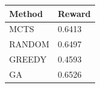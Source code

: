 \begin{tabular}{ll}
\hline
Method & Reward \\
\hline
  MCTS & 0.6413 \\
  RANDOM & 0.6497 \\
  GREEDY & 0.4593 \\
  GA & 0.6526 \\
\hline
\end{tabular}

